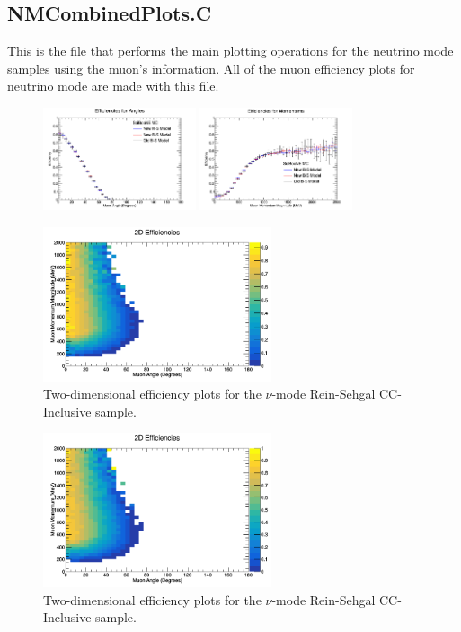 \documentclass[11pt]{article}
\begin{document}
\subsection{NMCombinedPlots.C}
This is the file that performs the main plotting operations for the neutrino mode samples using the muon's information. All of the muon efficiency plots for neutrino mode are made with this file.

\begin{figure}[H]
\centering
\includegraphics[width=0.4\textwidth]{NMCombinedPlotsImages/22-NMCombinedPlots.png}
\includegraphics[width=0.4\textwidth]{NMCombinedPlotsImages/23-NMCombinedPlots.png}
\caption{}
\end{figure}

\begin{figure}[H]
\centering
\includegraphics[width=0.6\textwidth]{CCInclusivePlots/2DEffCompareNMRS.png}
\caption{Two-dimensional efficiency plots for the $\nu$-mode Rein-Sehgal CC-Inclusive sample.}
\end{figure}

\begin{figure}[H]
\centering
\includegraphics[width=0.6\textwidth]{CCInclusivePlots/2DEffCompareNMBS.png}
\caption{Two-dimensional efficiency plots for the $\nu$-mode Rein-Sehgal CC-Inclusive sample.}
\end{figure}
\end{document}
